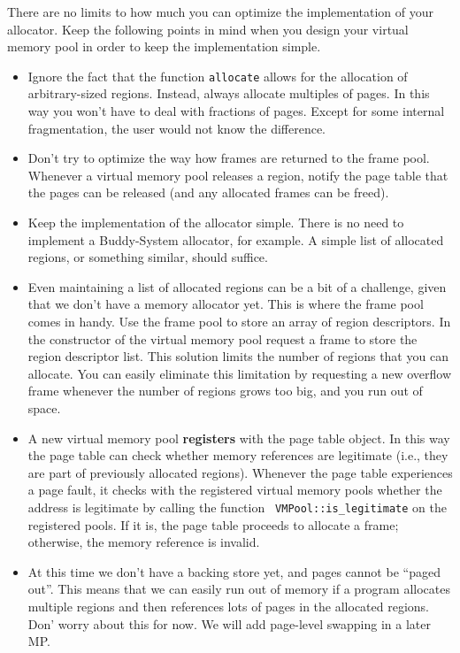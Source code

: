 \documentclass[letterpaper,11pt]{article}
\begin{document}
{There are no limits to how much you can optimize the implementation of
your allocator. Keep the following points in mind when you design your
virtual memory pool in order to keep the implementation simple. 
\begin{itemize}
\item Ignore the fact that the function {\tt allocate} allows for the
  allocation of arbitrary-sized regions. Instead, always allocate
  multiples of pages. In this way you won't have to deal with
  fractions of pages. Except for some internal fragmentation, the user
  would not know the difference.
\item Don't try to optimize the way how frames are returned to the
  frame pool. Whenever a virtual memory pool releases a region, notify
  the page table that the pages can be released (and any allocated
  frames can be freed).
\item Keep the implementation of the allocator simple. There is no
  need to implement a Buddy-System allocator, for example. A simple
  list of allocated regions, or something similar, should suffice.
\item Even maintaining a list of allocated regions can be a bit of a
  challenge, given that we don't have a memory allocator yet. This is
  where the frame pool comes in handy. Use the frame pool to store an
  array of region descriptors. In the constructor of the virtual
  memory pool request a frame to store the region descriptor
  list. This solution limits the number of regions that you can
  allocate. You can easily eliminate this limitation by requesting a
  new overflow frame whenever the number of regions grows too big, and
  you run out of space.
\item A new virtual memory pool {\bf registers} with the page table
  object. In this way the page table can check whether memory
  references are legitimate (i.e., they are part of previously
  allocated regions). Whenever the page table experiences a page
  fault, it checks with the registered virtual memory pools whether
  the address is legitimate by calling the function {\tt
    VMPool::is\_legitimate} on the registered pools. If it is, 
  the page table proceeds to
  allocate a frame; otherwise, the memory reference is invalid.
\item At this time we don't have a backing store yet, and pages
  cannot be ``paged out''. This means that we can easily run out of
  memory if a program allocates multiple regions and then references
  lots of pages in the allocated regions. Don' worry about this for
  now. We will add page-level swapping in a later MP.
\end{itemize}

}
\end{document}
